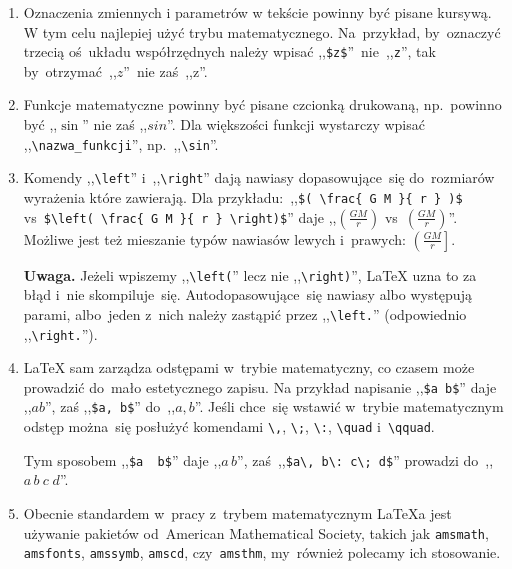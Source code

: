 \documentclass[a4paper,11pt]{article}
\newcommand{\tbs}{\textbackslash}  %
\begin{document}
\begin{enumerate}
\item Oznaczenia zmiennych i parametrów w tekście powinny być pisane
  kursywą. W tym celu najlepiej użyć trybu matematycznego.
  Na~przykład, by~oznaczyć trzecią oś~układu współrzędnych należy
  wpisać ,,\texttt{\$z\$}''~nie~,,\texttt{z}'', tak
  by~otrzymać~,,$z$''~nie zaś~,,z''.
\item Funkcje matematyczne powinny być pisane czcionką drukowaną,
  np.~powinno być ,,$\sin$'' nie zaś ,,$sin$''. Dla większości funkcji
  wystarczy wpisać ,,\texttt{\tbs nazwa\_funkcji}'',
  np.~,,\texttt{\tbs sin}''.
\item Komendy ,,\texttt{\tbs left}'' i~,,\texttt{\tbs right}'' dają
  nawiasy dopasowujące~się do~rozmiarów wyrażenia które zawierają. Dla
  przykładu:~,,\texttt{\$( \tbs frac\{ G M \}\{ r \} )\$}
  vs~\texttt{\$\tbs left( \tbs frac\{ G M \}\{ r \} \tbs right)\$}''
  daje ,,$( \frac{ G M }{ r } )$
  vs~$\left( \frac{ G M }{ r } \right)$''. Możliwe jest też mieszanie
  typów nawiasów lewych i~prawych: $\left( \frac{ G M }{ r } \right]$.

  \textbf{Uwaga.} Jeżeli wpiszemy ,,\texttt{\tbs left(}'' lecz nie
  ,,\texttt{\tbs right)}'', \LaTeX{} uzna to za błąd i~nie
  skompiluje~się. Autodopasowujące~się nawiasy albo występują parami,
  albo~jeden z~nich należy zastąpić przez ,,\texttt{\tbs left.}''
  (odpowiednio ,,\texttt{\tbs right.}'').
\item \LaTeX{} sam zarządza odstępami w~trybie matematyczny, co czasem
  może prowadzić do~mało estetycznego zapisu. Na przykład napisanie
  ,,\texttt{\$a b\$}'' daje ,,$a b$'', zaś ,,\texttt{\$a, b\$}''
  do~,,$a, b$''. Jeśli chce~się wstawić w~trybie matematycznym odstęp
  można~się posłużyć komendami \texttt{\tbs ,}, \texttt{\tbs ;},
  \texttt{\tbs :}, \texttt{\tbs quad} i~\texttt{\tbs qquad}.

  Tym sposobem ,,\texttt{\$a\, b\$}'' daje ,,$a\, b$'',
  zaś~,,\texttt{\$a\tbs , b\tbs : c\tbs ; d\$}'' prowadzi
  do~,,$a\, b\: c\; d$''.
\item Obecnie standardem w~pracy z~trybem matematycznym \LaTeX a jest
  używanie pakietów od~American Mathematical Society, takich jak
  \texttt{amsmath}, \texttt{amsfonts}, \texttt{amssymb},
  \texttt{amscd}, czy~\texttt{amsthm}, my~również polecamy ich
  stosowanie.


\end{enumerate}
\end{document}
